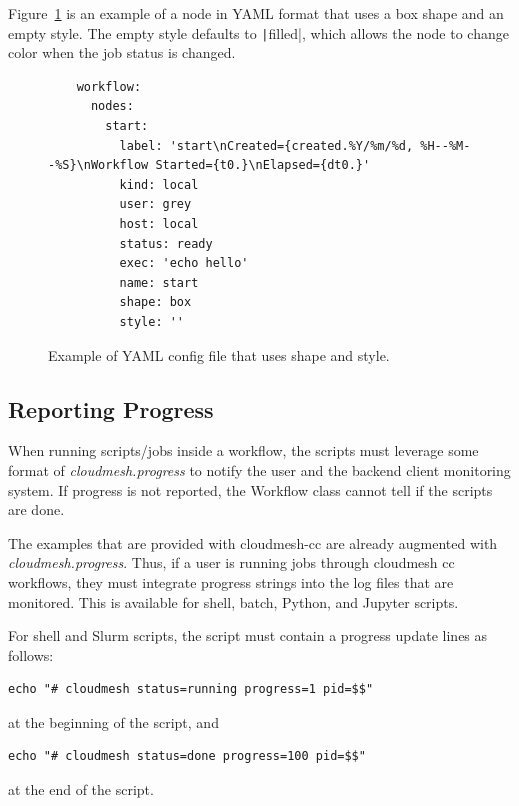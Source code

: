 \documentclass[sigplan,screen]{acmart}
\begin{document}
Figure~\ref{fig:shape-style-yaml} is an example of a node in YAML
format that uses a box shape and an empty style. The empty style
defaults to \texttt|filled|, which allows the node to change
color when the job status is changed.

\begin{figure}
    \begin{verbatim}
    workflow:
      nodes:
        start:
          label: 'start\nCreated={created.%Y/%m/%d, %H--%M--%S}\nWorkflow Started={t0.}\nElapsed={dt0.}'
          kind: local
          user: grey
          host: local
          status: ready
          exec: 'echo hello'
          name: start
          shape: box
          style: ''
    \end{verbatim}
    \caption{Example of YAML config file that uses shape and style.}
    \label{fig:shape-style-yaml}
\end{figure}



\subsection{Reporting Progress}\label{reporting-progress}

When running scripts/jobs inside a workflow, the scripts must leverage
some format of {\em cloudmesh.progress} to notify the user and the
backend client monitoring system. If progress is not reported, the
Workflow class cannot tell if the scripts are done.

The examples that are provided with cloudmesh-cc are already augmented
with {\em cloudmesh.progress}. Thus, if a user is running jobs through
cloudmesh cc workflows, they must integrate progress strings into the
log files that are monitored. This is available for shell, batch,
Python, and Jupyter scripts.

For shell and Slurm scripts, the script must contain a progress update
lines as follows:

\begin{verbatim}
echo "# cloudmesh status=running progress=1 pid=$$"
\end{verbatim}

at the beginning of the script, and

\begin{verbatim}
echo "# cloudmesh status=done progress=100 pid=$$"
\end{verbatim}

at the end of the script.
\end{document}
